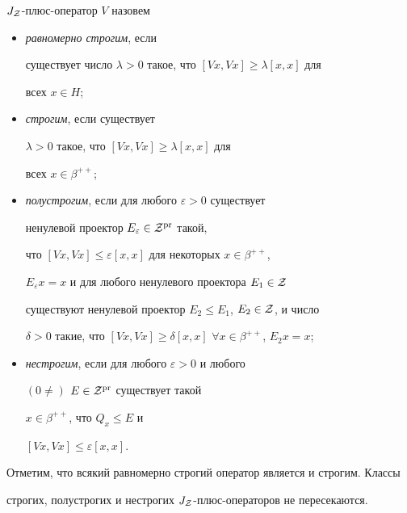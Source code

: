 \begin{defn}


$J_{\cal Z}$-плюс-оператор $V$ назовем


\begin{itemize}


\item[1)] {\it равномерно строгим}, если


существует число $\lambda > 0$ такое, что $[Vx,Vx]\geq\lambda [x,x]$ для


всех $x\in H$;


\item[2)] {\it строгим}, если существует


$\lambda > 0$ такое, что $[Vx,Vx]\geq\lambda [x,x]$ для


всех $x\in \beta^{++}$;


\item[3)] {\it полустрогим}, если для любого $\varepsilon >0$ существует


ненулевой проектор $E_{\varepsilon}\in {\cal Z}^{\operatorname{pr}}$ такой,


что $[Vx,Vx]\leq \varepsilon [x,x]$ для некоторых $x\in \beta^{++}$,


$E_{\varepsilon}x=x$ и для любого ненулевого проектора $E_{1}\in\cal Z$


существуют ненулевой проектор $E_{2}\leq E_{1}$, $E_{2}\in\cal Z$, и число


$\delta >0$ такие, что $[Vx,Vx]\geq \delta [x,x]$ $\forall x\in


\beta^{++}$, $E_{2}x=x$;


\item[4)] {\it нестрогим}, если для любого $\varepsilon >0$ и любого 


$(0\ne)$ $E\in {\cal Z}^{\operatorname{pr}}$ существует такой


$x\in \beta^{++}$, что $Q_{x}\leq E$ и


$[Vx,Vx] \leq\varepsilon [x,x]$.


\end{itemize}


\end{defn}





Отметим, что всякий равномерно строгий оператор является и строгим. Классы 


строгих, полустрогих и нестрогих $J_{\cal Z}$-плюс-операторов не пересекаются.





